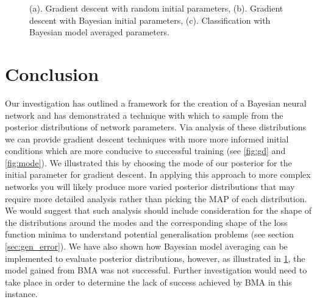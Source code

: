 \documentclass[review]{siamart190516}
\begin{document}
\begin{figure}[!h]
\begin{subfigure}[b]{0.325\textwidth}
			\caption{}
			\label{fig:bma}
		\end{subfigure}
		\caption{(a). Gradient descent with random initial parameters, (b). Gradient descent with Bayesian initial parameters, (c). Classification with Bayesian model averaged parameters.}  
		\label{fig:varying speed and length}
	\end{figure}

\section{Conclusion}
Our investigation has outlined a framework for the creation of a Bayesian neural network and has demonstrated a technique with which to sample from the posterior distributions of network parameters. Via analysis of these distributions we can provide gradient descent techniques with more more informed initial conditions which are more conducive to successful training (see \ref{fig:gd} and \ref{fig:mode}). We illustrated this by choosing the mode of our posterior for the initial parameter for gradient descent. In applying this approach to more complex networks you will likely produce more varied posterior distributions that may require more detailed analysis rather than picking the MAP of each distribution. We would suggest that such analysis should include consideration for the shape of the distributions around the modes and the corresponding shape of the loss function minima to understand potential generalisation problems (see section \ref{sec:gen_error}). \newline
We have also shown how Bayesian model averaging can be implemented to evaluate posterior distributions, however, as illustrated in \ref{fig:bma}, the model gained from BMA was not successful. Further investigation would need to take place in order to determine the lack of success achieved by BMA in this instance.




\newpage
\end{document}
